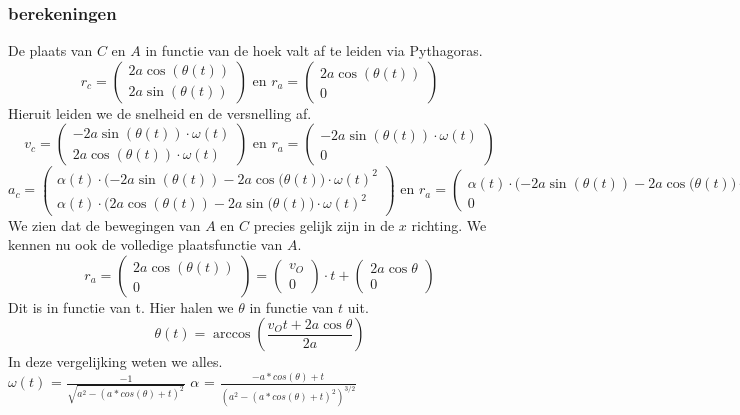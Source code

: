 \documentclass[10pt,a4paper]{article}
\begin{document}
\subsubsection*{berekeningen}
De plaats van $C$ en $A$ in functie van de hoek valt af te leiden via Pythagoras.
\[
r_{c} =
\begin{pmatrix}
2a\cos{(\theta(t))}\\
2a\sin{(\theta(t))}
\end{pmatrix}
\text{ en }
r_{a} =
\begin{pmatrix}
2a\cos{(\theta(t))}\\
0
\end{pmatrix}
\]
Hieruit leiden we de snelheid en de versnelling af.
\[
v_{c} =
\begin{pmatrix}
-2a\sin{(\theta(t))}\cdot\omega(t)\\
2a\cos{(\theta(t))}\cdot\omega(t)
\end{pmatrix}
\text{ en }
r_{a} =
\begin{pmatrix}
-2a\sin{(\theta(t))}\cdot\omega(t)\\
0
\end{pmatrix}
\]
\[
a_{c} =
\begin{pmatrix}
\alpha(t)\cdot (-2a\sin({\theta(t)})-2a\cos({\theta(t))}\cdot\omega(t)^{2}\\
\alpha(t)\cdot (2a\cos({\theta(t)})-2a\sin({\theta(t))}\cdot\omega(t)^{2}
\end{pmatrix}
\text{ en }
r_{a} =
\begin{pmatrix}
\alpha(t)\cdot (-2a\sin({\theta(t)})-2a\cos({\theta(t))}\cdot\omega(t)^{2}\\
0
\end{pmatrix}
\]
We zien dat de bewegingen van $A$ en $C$ precies gelijk zijn in de $x$ richting.
We kennen nu ook de volledige plaatsfunctie van $A$.
\[
r_{a} =
\begin{pmatrix}
2a\cos{(\theta(t))}\\
0
\end{pmatrix}
=
\begin{pmatrix}
v_{O}\\
0
\end{pmatrix}
\cdot t
+
\begin{pmatrix}
2a\cos{\theta}\\
0
\end{pmatrix}
\]
Dit is in functie van t. Hier halen we $\theta$ in functie van $t$ uit.
\[
\theta(t) = \arccos{\left(\frac{v_{O}t + 2a\cos{\theta}}{2a}\right)}
\]
In deze vergelijking weten we alles.\\
$\omega(t)$ = $\frac{-1}{\sqrt{a^2-(a*cos(\theta)+t)^2}}$\hspace{3cm} $\alpha$ = $\frac{-a*cos(\theta) + t}{(a^2- (a*cos(\theta) +t)^2)^{3/2}}$\\
\end{document}
